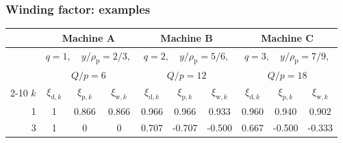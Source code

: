 \begin{frame}
	\frametitle{Winding factor: examples}
	\begin{table}
		\centering
		\begin{tabular}{r c c c c c c c c c}
			    & \multicolumn{3}{c}{Machine A}                           & \multicolumn{3}{c}{Machine B}                           & \multicolumn{3}{c}{Machine C}                                                                                                                                                                     \\
			\toprule
			    & \multicolumn{3}{c}{$q=1, \quad y/\rho_\mathrm{p}=2/3,$} & \multicolumn{3}{c}{$q=2, \quad y/\rho_\mathrm{p}=5/6,$} & \multicolumn{3}{c}{$q=3, \quad y/\rho_\mathrm{p}=7/9,$}                                                                                                                                           \\
			    & \multicolumn{3}{c}{$Q/p = 6$}                           & \multicolumn{3}{c}{$Q/p = 12$}                          & \multicolumn{3}{c}{$Q/p = 18$}                                                                                                                                                                    \\
			\cmidrule{2-10}
			$k$ & $\xi_{\mathrm{d},k}$                                    & $\xi_{\mathrm{p},k}$                                    & $\xi_{\mathrm{w},k}$                                    & $\xi_{\mathrm{d},k}$ & $\xi_{\mathrm{p},k}$ & $\xi_{\mathrm{w},k}$ & $\xi_{\mathrm{d},k}$ & $\xi_{\mathrm{p},k}$ & $\xi_{\mathrm{w},k}$ \\
			\midrule
			1   & 1                                                       & 0.866                                                   & 0.866                                                   & 0.966                & 0.966                & 0.933                & 0.960                & 0.940                & 0.902                \\
			3   & 1                                                       & 0                                                       & 0                                                       & 0.707                & -0.707               & -0.500               & 0.667                & -0.500               & -0.333               \\

\end{tabular}
\end{table}
\end{frame}
